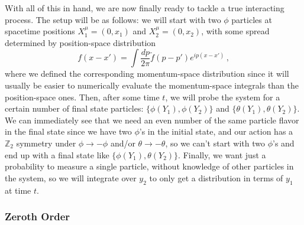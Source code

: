 \documentclass{article}
\newcommand{\td}[1]{\tilde{#1}}
\numberwithin{equation}{subsection}
\begin{document}
With all of this in hand, we are now finally ready to tackle a true interacting process. The setup will be as follows: we will start with two $\phi$ particles at spacetime positions 
$X_1^\mu = (0, x_1)$ and $X_2^\mu = (0, x_2)$, with some spread determined by position-space distribution
\begin{equation}
    f(x-x') = \int\frac{dp}{2\pi}\td f(p - p') e^{ip(x-x')}\,,
\end{equation}
where we defined the corresponding momentum-space distribution since it will usually be easier to numerically evaluate the momentum-space integrals than the position-space ones. 
Then, after some time $t$, we will probe the system for a certain number of final state particles: $\{\phi(Y_1),\phi(Y_2)\}$ and $\{\theta(Y_1),\theta(Y_2)\}$. 
We can immediately see that we need an even number of the same particle flavor in the final state since we have two $\phi$'s in the initial state, and 
our action has a $\mathbb{Z}_2$ symmetry under $\phi\to-\phi$ and/or $\theta\to-\theta$, so we can't start with two $\phi$'s and end up with a final
state like $\{\phi(Y_1),\theta(Y_2)\}$. Finally, we want just a probability to measure a single particle, without knowledge of other 
particles in the system, so we will integrate over $y_2$ to only get a distribution in terms of $y_1$ at time $t$.

\subsubsection{Zeroth Order}
\end{document}
